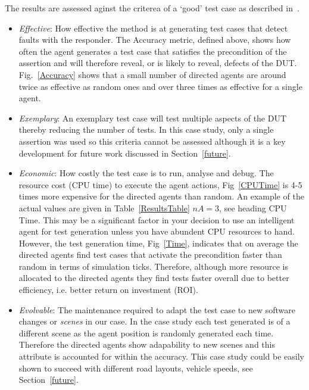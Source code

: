 \documentclass[letterpaper, 10 pt, journal, twoside]{IEEEtran}
\begin{document}
The results are assessed aginst the criterea of a `good' test case as described in~\cite{fewster1999software}.
\begin{itemize}
	\item \textit{Effective}: How effective the method is at generating test cases that detect faults with the responder. The Accuracy metric, defined above, shows how often the agent generates a test case that satisfies the precondition of the assertion and will therefore reveal, or is likely to reveal, defects of the DUT. Fig.~\ref{Accuracy} shows that a small number of directed agents are around twice as effective as random ones and over three times as effective for a single agent.
	\item \textit{Exemplary}: An exemplary test case will test multiple aspects of the DUT thereby reducing the number of tests. In this case study, only a single assertion was used so this criteria cannot be assessed although it is a key development for future work discussed in Section~\ref{future}.
	\item \textit{Economic}: How costly the test case is to run, analyse and debug. The resource cost (CPU time) to execute the agent actions, Fig~\ref{CPUTime} is 4-5 times more expensive for the directed agents than random. An example of the actual values are given in Table~\ref{ResultsTable} $nA=3$, see heading CPU Time. This may be a significant factor in your decision to use an intelligent agent for test generation unless you have abundent CPU resources to hand. %
	However, the test generation time, Fig~\ref{Time}, indicates that on average the directed agents find test cases that activate the precondition faster than random in terms of simulation ticks. Therefore, although more resource is allocated to the directed agents they find tests faster overall due to better efficiency, i.e. better return on investment (ROI).
	\item \textit{Evolvable}: The maintenance required to adapt the test case to new software changes or \textit{scenes} in our case. In the case study each test generated is of a different scene as the agent position is randomly generated each time. Therefore the directed agents show adapability to new scenes and this attribute is accounted for within the accuracy. This case study could be easily shown to succeed with different road layouts, vehicle speeds, see Section~\ref{future}.
\end{itemize}

\end{document}
